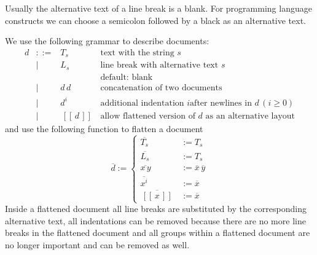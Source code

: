 \documentclass[12pt]{article}
\def\GS{\,[\![\,}
\def\GE{\,]\!]\,}
\newcommand{\group}[1]{\GS #1 \GE}
\newcommand{\flatten}[1]{\overline{#1}}
\begin{document}
Usually the alternative text of a line break is a blank. For programming
language constructs we can choose a semicolon followed by a black as an
alternative text.

We use the following grammar to describe documents:
$$
\begin{array}{llll}
  d &::=& T_s     & \text{text with the string } s
  \\
    & \mid & L_s  & \text{line break with alternative text } s
  \\ & & &\text{default: blank}
  \\
    & \mid & d\, d & \text{concatenation of two documents}
  \\
    & \mid & d^i   & \text{additional indentation $i$
                     after newlines in } d\, (i \ge 0)
  \\
    & \mid & \group{d} & \text{allow flattened version of $d$ as an
                         alternative layout}
\end{array}
$$%
and use the following function to flatten a document
$$
\flatten{d} :=
\begin{cases}
  \flatten{T_s} &:= T_s
  \\
  \flatten{L_s} &:= T_s
  \\
  \flatten{x\, y} &:= \flatten{x} \, \flatten{y}
  \\
  \flatten{x^i} &:= \flatten{x}
  \\
  \flatten{\group{x}} &:= \flatten{x}
\end{cases}
$$
%
Inside a flattened document all line breaks are substituted by the
corresponding alternative text, all indentations can be removed because there
are no more line breaks in the flattened document and all groups within a
flattened document are no longer important and can be removed as well.
\end{document}
